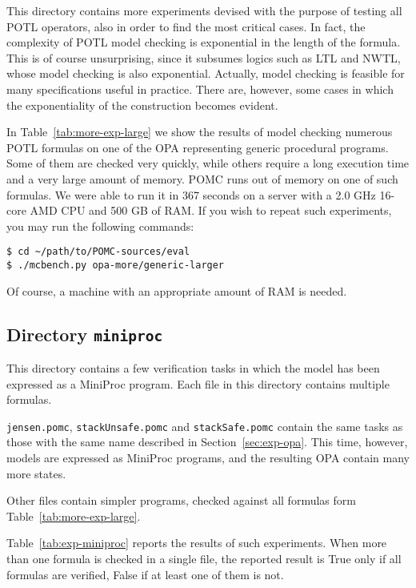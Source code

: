 \documentclass[9pt,a4paper]{article}
\begin{document}
This directory contains more experiments devised with the purpose of
testing all POTL operators, also in order to find the most critical
cases.  In fact, the complexity of POTL model checking is exponential
in the length of the formula.  This is of course unsurprising, since
it subsumes logics such as LTL and NWTL, whose model checking is also
exponential.  Actually, model checking is feasible for many
specifications useful in practice.  There are, however, some cases in
which the exponentiality of the construction becomes evident.

In Table~\ref{tab:more-exp-large} we show the results of model checking numerous
POTL formulas on one of the OPA representing generic procedural programs.
Some of them are checked very quickly,
while others require a long execution time and a very large amount of
memory. POMC runs out of memory on one of such formulas.
We were able to run it in 367 seconds on a server with
a 2.0 GHz 16-core AMD CPU and 500 GB of RAM.
If you wish to repeat such experiments, you may run the following
commands:
\begin{verbatim}
$ cd ~/path/to/POMC-sources/eval
$ ./mcbench.py opa-more/generic-larger
\end{verbatim}
Of course, a machine with an appropriate amount of RAM is needed.


\subsection{Directory \texttt{miniproc}}

This directory contains a few verification tasks in which the model
has been expressed as a MiniProc program.
Each file in this directory contains multiple formulas.

\texttt{jensen.pomc}, \texttt{stackUnsafe.pomc} and \texttt{stackSafe.pomc}
contain the same tasks as those with the same name described in Section~\ref{sec:exp-opa}.
This time, however, models are expressed as MiniProc programs, and the resulting
OPA contain many more states.

Other files contain simpler programs, checked against all formulas form
Table~\ref{tab:more-exp-large}.

Table~\ref{tab:exp-miniproc} reports the results of such experiments.
When more than one formula is checked in a single file, the reported result is True
only if all formulas are verified, False if at least one of them is not.
\end{document}
